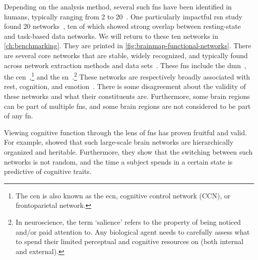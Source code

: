 Depending on the analysis method, several such \glspl{fn} have been identified in humans, typically ranging from 2 to 20~\parencite{Yeo2011, Heine2012, Glomb2017}.
One particularly impactful \gls{rsn} study found 20 networks~\parencite{Smith2009, Laird2011}, ten of which showed strong overlap between resting-state and task-based data networks.
We will return to these ten networks in \cref{ch:benchmarking}.
They are printed in \cref{fig:brainmap-functional-networks}.
%
There are several core networks that are stable, widely recognized, and typically found across network extraction methods and data sets~\parencite{Uddin2019}.
These \glspl{fn} include the \gls{dmn}~\parencite{Raichle2001, Raichle2007, Vatansever2015}, the \gls{cen}~\parencite{Rogers2004},\footnote{The \gls{cen} is also known as the \gls{ecn}, cognitive control network (CCN), or frontoparietal network.} and the \gls{sn}~\parencite{Drevets2000, Seeley2007}.\footnote{In neuroscience, the term `salience' refers to the property of being noticed and/or paid attention to. Any biological agent needs to carefully assess what to spend their limited perceptual and cognitive resources on (both internal and external).}
These networks are respectively broadly associated with rest, cognition, and emotion~\parencite{Uddin2019}.
%
There is some disagreement about the validity of these networks and what their constituents are.
Furthermore, some brain regions can be part of multiple \glspl{fn}, and some brain regions are not considered to be part of any \gls{fn}.

Viewing cognitive function through the lens of \glspl{fn} has proven fruitful and valid.
For example, \textcite{Vidaurre2017} showed that such large-scale brain networks are hierarchically organized and heritable.
Furthermore, they show that the switching between such networks is not random, and the time a subject spends in a certain state is predictive of cognitive traits.
